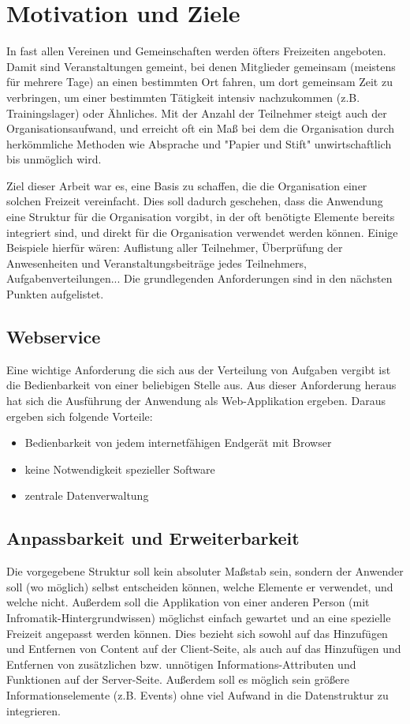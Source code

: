\section{Motivation und Ziele}
In fast allen Vereinen und Gemeinschaften werden öfters Freizeiten angeboten. Damit sind Veranstaltungen gemeint, bei denen Mitglieder gemeinsam (meistens für mehrere Tage) an einen bestimmten Ort fahren, um dort gemeinsam Zeit zu verbringen, um einer bestimmten Tätigkeit intensiv nachzukommen (z.B. Trainingslager)  oder Ähnliches. Mit der Anzahl der Teilnehmer steigt auch der Organisationsaufwand, und erreicht oft ein Maß bei dem die Organisation durch herkömmliche Methoden wie Absprache und "Papier und Stift" unwirtschaftlich bis unmöglich wird. 

Ziel dieser Arbeit war es, eine Basis zu schaffen, die die Organisation einer solchen Freizeit vereinfacht. Dies soll dadurch geschehen, dass die Anwendung eine Struktur für die Organisation vorgibt, in der oft benötigte Elemente bereits integriert sind, und direkt für die Organisation verwendet werden können. Einige Beispiele hierfür wären: Auflistung aller Teilnehmer, Überprüfung der Anwesenheiten und Veranstaltungsbeiträge jedes Teilnehmers, Aufgabenverteilungen... 
Die grundlegenden Anforderungen sind in den nächsten Punkten aufgelistet. 

\subsection{Webservice}
Eine wichtige Anforderung die sich aus der Verteilung von Aufgaben vergibt ist die Bedienbarkeit von einer beliebigen Stelle aus. Aus dieser Anforderung heraus hat sich die Ausführung der Anwendung als Web-Applikation ergeben. Daraus ergeben sich folgende Vorteile:

\begin{itemize}
	\item Bedienbarkeit von jedem internetfähigen Endgerät mit Browser
	\item keine Notwendigkeit spezieller Software
	\item zentrale Datenverwaltung
\end{itemize}

\subsection{Anpassbarkeit und Erweiterbarkeit}
Die vorgegebene Struktur soll kein absoluter Maßstab sein, sondern der Anwender soll (wo möglich) selbst entscheiden können, welche Elemente er verwendet, und welche nicht.
Außerdem soll die Applikation von einer anderen Person (mit Infromatik-Hintergrundwissen) möglichst einfach gewartet und an eine spezielle Freizeit angepasst werden können. Dies bezieht sich sowohl auf das Hinzufügen und Entfernen von Content auf der Client-Seite, als auch auf das Hinzufügen und Entfernen von zusätzlichen bzw. unnötigen Informations-Attributen und Funktionen auf der Server-Seite. Außerdem soll es möglich sein größere Informationselemente (z.B. Events) ohne viel Aufwand in die Datenstruktur zu integrieren.

